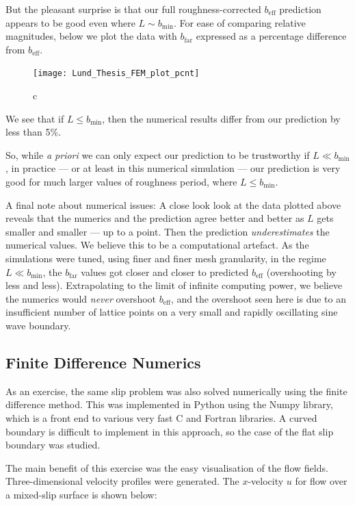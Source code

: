 \documentclass[12pt, a4paper, twoside, openright]{book}
\newcommand{\beff}{\ensuremath{b_{\mathrm{eff}}}}
\newcommand{\bmin}{\ensuremath{b_{\mathrm{min}}}}
\newcommand{\bfar}{\ensuremath{b_{\mathrm{far}}}}
\begin{document}
But the pleasant surprise is that our full roughness-corrected $\beff$ prediction appears to be good even where $L \sim \bmin$.
For ease of comparing relative magnitudes, below we plot the data with $\bfar$ expressed as a percentage difference from $\beff$.


\begin{figure}[ht]
\texttt{[image: Lund\_Thesis\_FEM\_plot\_pcnt]}
\caption{c}\label{c}
\end{figure}

We see that if $L \leq \bmin$, then the numerical results differ from our prediction by less than 5\%.

So, while \emph{a priori} we can only expect our prediction to be trustworthy if $L \ll \bmin$, in practice --- or at least in this numerical simulation --- our prediction is very good for much larger values of roughness period, where $L \leq \bmin$.


\vspace{2em}

A final note about numerical issues:  A close look look at the data plotted above reveals that the numerics and the prediction agree better and better as $L$ gets smaller and smaller --- up to a point.  Then the prediction \emph{underestimates} the numerical values.  We believe this to be a computational artefact.  As the simulations were tuned, using finer and finer mesh granularity, in the regime $L \ll \bmin$, the $\bfar$ values got closer and closer to predicted $\beff$ (overshooting by less and less).  Extrapolating to the limit of infinite computing power, we believe the numerics would \emph{never} overshoot $\beff$, and the overshoot seen here is due to an insufficient number of lattice points on a very small and rapidly oscillating sine wave boundary.


\clearpage
\subsection*{Finite Difference Numerics}

As an exercise, the same slip problem was also solved numerically using the finite difference method.  This was implemented in Python using the Numpy library, which is a front end to various very fast C and Fortran libraries.  A curved boundary is difficult to implement in this approach, so the case of the flat slip boundary was studied.

The main benefit of this exercise was the easy visualisation of the flow fields. Three-dimensional velocity profiles were generated.  The $x$-velocity $u$ for flow over a mixed-slip surface is shown below:
\end{document}
